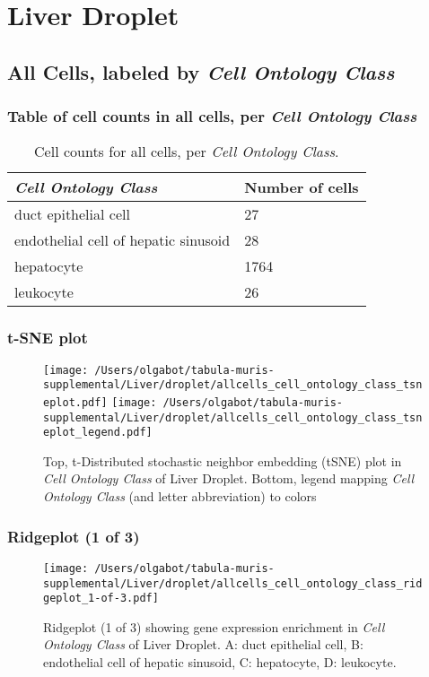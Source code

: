 \clearpage
\section{Liver Droplet}

\subsection{All Cells, labeled by \emph{Cell Ontology Class}}
\subsubsection{Table of cell counts in all cells, per \emph{Cell Ontology Class}}\begin{table}[h]
\centering
\label{my-label}
\begin{tabular}{@{}ll@{}}
\toprule

\emph{Cell Ontology Class}& Number of cells \\ \midrule
duct epithelial cell & 27 \\

endothelial cell of hepatic sinusoid & 28 \\

hepatocyte & 1764 \\

leukocyte & 26 \\
\bottomrule
\end{tabular}
\caption{Cell counts for all cells, per \emph{Cell Ontology Class}.}
\end{table}

\clearpage
\subsubsection{t-SNE plot}
\begin{figure}[h]
\centering
\texttt{[image: /Users/olgabot/tabula-muris-supplemental/Liver/droplet/allcells\_cell\_ontology\_class\_tsneplot.pdf]}
\texttt{[image: /Users/olgabot/tabula-muris-supplemental/Liver/droplet/allcells\_cell\_ontology\_class\_tsneplot\_legend.pdf]}
\caption{Top, t-Distributed stochastic neighbor embedding (tSNE) plot  in \emph{Cell Ontology Class} of Liver Droplet. Bottom, legend mapping \emph{Cell Ontology Class} (and letter abbreviation) to colors}
\end{figure}


\clearpage

\subsubsection{Ridgeplot (1 of 3)}
\begin{figure}[h]
\centering
\texttt{[image: /Users/olgabot/tabula-muris-supplemental/Liver/droplet/allcells\_cell\_ontology\_class\_ridgeplot\_1-of-3.pdf]}

\caption{ Ridgeplot (1 of 3)  showing gene expression enrichment in \emph{Cell Ontology Class} of Liver Droplet. A: duct epithelial cell, B: endothelial cell of hepatic sinusoid, C: hepatocyte, D: leukocyte.}
\end{figure}


